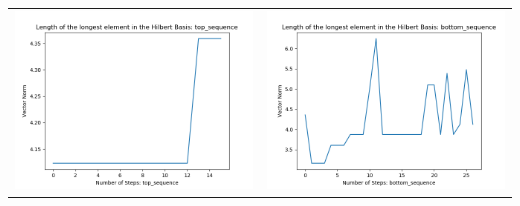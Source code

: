 \documentclass[10pt]{article}
\begin{document}
\begin{tabular}{c|c}
\begin{minipage}{.4\textwidth}
\includegraphics[width=\textwidth]{"DATA/4d/5 generators 2 bound I/top_sequence LENGTH"}
\end{minipage} &
\begin{minipage}{.4\textwidth}
\includegraphics[width=\textwidth]{"DATA/4d/5 generators 2 bound I bottomup/bottom_sequence LENGTH"}
\end{minipage}
\end{tabular}
\end{document}

